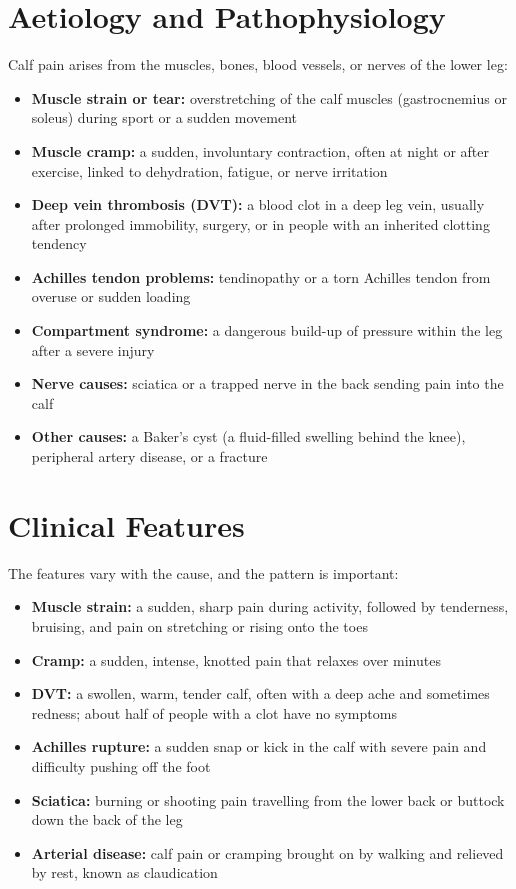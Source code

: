 \section*{Aetiology and Pathophysiology}
Calf pain arises from the muscles, bones, blood vessels, or nerves of the lower leg:
\begin{itemize}
    \item \textbf{Muscle strain or tear:} overstretching of the calf muscles (gastrocnemius or soleus) during sport or a sudden movement
    \item \textbf{Muscle cramp:} a sudden, involuntary contraction, often at night or after exercise, linked to dehydration, fatigue, or nerve irritation
    \item \textbf{Deep vein thrombosis (DVT):} a blood clot in a deep leg vein, usually after prolonged immobility, surgery, or in people with an inherited clotting tendency
    \item \textbf{Achilles tendon problems:} tendinopathy or a torn Achilles tendon from overuse or sudden loading
    \item \textbf{Compartment syndrome:} a dangerous build-up of pressure within the leg after a severe injury
    \item \textbf{Nerve causes:} sciatica or a trapped nerve in the back sending pain into the calf
    \item \textbf{Other causes:} a Baker's cyst (a fluid-filled swelling behind the knee), peripheral artery disease, or a fracture
\end{itemize}

\section*{Clinical Features}
The features vary with the cause, and the pattern is important:
\begin{itemize}
    \item \textbf{Muscle strain:} a sudden, sharp pain during activity, followed by tenderness, bruising, and pain on stretching or rising onto the toes
    \item \textbf{Cramp:} a sudden, intense, knotted pain that relaxes over minutes
    \item \textbf{DVT:} a swollen, warm, tender calf, often with a deep ache and sometimes redness; about half of people with a clot have no symptoms
    \item \textbf{Achilles rupture:} a sudden snap or kick in the calf with severe pain and difficulty pushing off the foot
    \item \textbf{Sciatica:} burning or shooting pain travelling from the lower back or buttock down the back of the leg
    \item \textbf{Arterial disease:} calf pain or cramping brought on by walking and relieved by rest, known as claudication
\end{itemize}

